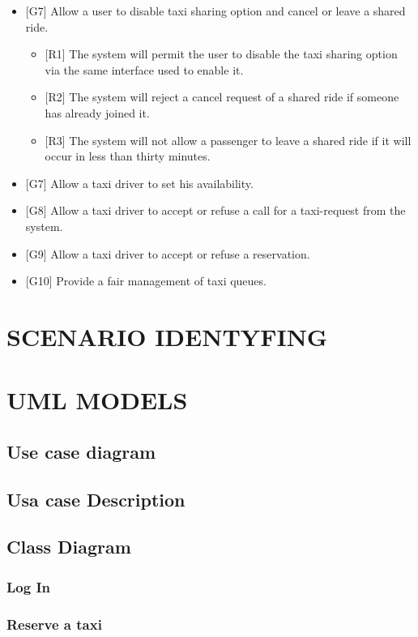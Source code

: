 \documentclass[a4paper, 12pt, titlepage]{article}
\begin{document}
\begin{itemize}
\begin{itemize}
			\end{itemize}
		\item {[G7]} Allow a user to disable taxi sharing option and cancel or leave a shared ride.
			\begin{itemize}
				\item {[R1]} The system will permit the user to disable the taxi sharing option via the same interface used to enable it.
				\item {[R2]} The system will reject a cancel request of a shared ride if someone has already joined it.
				\item {[R3]} The system will not allow a passenger to leave a shared ride if it will occur in less than thirty minutes.
			\end{itemize}
		\item {[G7]} Allow a taxi driver to set his availability.
		\item {[G8]} Allow a taxi driver to accept or refuse a call for a taxi-request from the system.
		\item {[G9]} Allow a taxi driver to accept or refuse a reservation.
		\item {[G10]} Provide a fair management of taxi queues.
	\end{itemize}
\newpage

\section{SCENARIO IDENTYFING}

\newpage

\section{UML MODELS}
\subsection{Use case diagram}
\subsection{Usa case Description}
\subsection{Class Diagram}
\subsubsection{Log In}
\subsubsection{Reserve a taxi}
\end{document}
